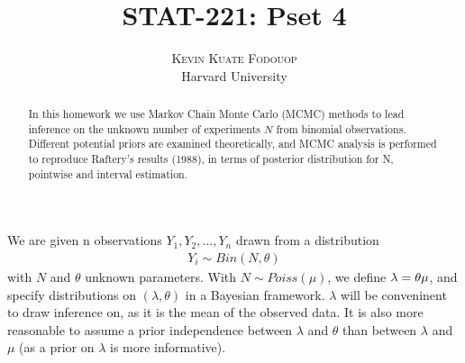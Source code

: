 \documentclass[twoside]{article}
\title{\vspace{-15mm}\fontsize{24pt}{10pt}\selectfont\textbf{STAT-221: Pset 4}} %
\author{
\large
\textsc{Kevin Kuate Fodouop}\\ %
\normalsize Harvard University \\ %
\vspace{-5mm}
}
\date{}
\begin{document}
\maketitle %

\thispagestyle{fancy} %


\begin{abstract}
In this homework we use Markov Chain Monte Carlo (MCMC) methods to lead inference on the unknown number of experiments $N$ from binomial observations. Different potential priors are examined theoretically, and MCMC analysis is performed to reproduce Raftery's results (1988), in terms of posterior distribution for N, pointwise and interval estimation.

\end{abstract}



We are given n observations $Y_1, Y_2, ..., Y_n$ drawn from a distribution
\begin{align*}
Y_i \sim Bin(N, \theta)
\end{align*}
with $N$ and $\theta$ unknown parameters. With $N \sim Poiss(\mu)$, we define $\lambda = \theta \* \mu$, and specify distributions on $(\lambda, \theta)$ in a Bayesian framework. $\lambda$ will be conveninent to draw inference on, as it is the mean of the observed data. It is also more reasonable to assume a prior independence between $\lambda$ and $\theta$ than between $\lambda$ and $\mu$ (as a prior on $\lambda$ is more informative).
\end{document}
